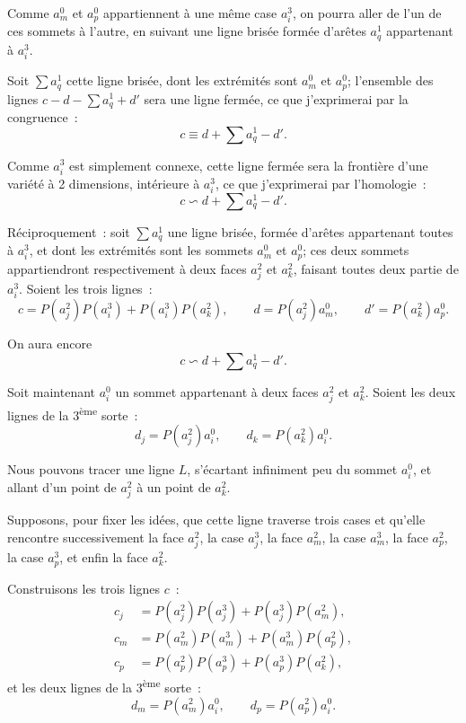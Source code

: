 \documentclass{article}
\begin{document}
Comme $a^{0}_{m}$ et $a^{0}_{p}$ appartiennent à une même case $a^{3}_{i}$, on pourra aller de l'un de ces sommets à l'autre, en suivant une ligne brisée formée d'arêtes $a^{1}_{q}$ appartenant à $a^{3}_{i}$.


Soit $\displaystyle\sum a^{1}_{q}$ cette ligne brisée, dont les extrémités sont $a^{0}_{m}$ et $a^{0}_{p}$; l'ensemble des lignes $c - d - \displaystyle\sum a^{1}_{q} + d'$ sera une ligne fermée, ce que j'exprimerai par la congruence~:
\[ c \equiv d + \sum a^{1}_{q} - d'. \]

Comme $a^{3}_{i}$ est simplement connexe, cette ligne fermée sera la frontière d'une variété à 2 dimensions, intérieure à $a^{3}_{i}$, ce que j'exprimerai par l'homologie~:
\[ c \backsim d + \sum a^{1}_{q} - d'. \]

Réciproquement~: soit $\displaystyle\sum a^{1}_{q}$ une ligne brisée, formée d'arêtes appartenant toutes à $a^{3}_{i}$, et dont les extrémités sont les sommets $a^{0}_{m}$ et $a^{0}_{p}$; ces deux sommets appartiendront respectivement à deux faces $a^{2}_{j}$ et $a^{2}_{k}$, faisant toutes deux partie de $a^{3}_{i}$. Soient les trois lignes~:
\[ c = P(a^{2}_{j}) P(a^{3}_{i}) + P(a^{3}_{i}) P(a^{2}_{k}), \qquad d = P(a^{2}_{j}) a^{0}_{m}, \qquad d' = P(a^{2}_{k}) a^{0}_{p}. \]

On aura encore
\[ c \backsim d + \sum a^{1}_{q} - d'. \]

Soit maintenant $a^{0}_{i}$ un sommet appartenant à deux faces $a^{2}_{j}$ et $a^{2}_{k}$. Soient les deux lignes de la 3\textsuperscript{ème} sorte~:
\[ d_{j} = P(a^{2}_{j}) a^{0}_{i}, \qquad d_{k} = P(a^{2}_{k}) a^{0}_{i}. \]

Nous pouvons tracer une ligne $L$, s'écartant infiniment peu du sommet $a^{0}_{i}$, et allant d'un point de $a^{2}_{j}$ à un point de $a^{2}_{k}$.

Supposons, pour fixer les idées, que cette ligne traverse trois cases et qu'elle rencontre successivement la face $a^{2}_{j}$, la case $a^{3}_{j}$, la face $a^{2}_{m}$, la case $a^{3}_{m}$, la face $a^{2}_{p}$, la case $a^{3}_{p}$, et enfin la face $a^{2}_{k}$.

Construisons les trois lignes $c$~:
\[ \begin{aligned} c_{j} &= P(a^{2}_{j}) P(a^{3}_{j}) + P(a^{3}_{j}) P(a^{2}_{m}), \\ c_{m} &= P(a^{2}_{m}) P(a^{3}_{m}) + P(a^{3}_{m}) P(a^{2}_{p}), \\ c_{p} &= P(a^{2}_{p}) P(a^{3}_{p}) + P(a^{3}_{p}) P(a^{2}_{k}), \end{aligned} \]
et les deux lignes de la 3\textsuperscript{ème} sorte~:
\[ d_{m} = P(a^{2}_{m}) a^{0}_{i}, \qquad d_{p} = P(a^{2}_{p}) a^{0}_{i}. \]
\end{document}
